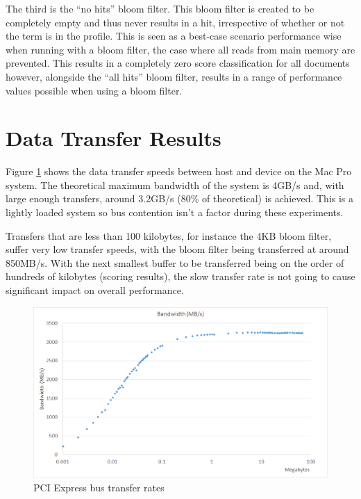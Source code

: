 The third is the ``no hits'' bloom filter. This bloom filter is created to be
completely empty and thus never results in a hit, irrespective of whether or not
the term is in the profile. This is seen as a best-case scenario performance
wise when running with a bloom filter, the case where all reads from main memory
are prevented. This results in a completely zero score classification for all
documents however, alongside the ``all hits'' bloom filter, results in a range
of performance values possible when using a bloom filter.

\section{Data Transfer Results}

Figure \ref{fig:dataTransfer} shows the data transfer speeds between host and
device on the Mac Pro system. The theoretical maximum bandwidth of the system is
4GB/s and, with large enough transfers, around 3.2GB/s (80\% of theoretical)
is achieved. This is a lightly loaded system so bus contention isn't a factor
during these experiments.

Transfers that are less than 100 kilobytes, for instance the 4KB bloom filter,
suffer very low transfer speeds, with the bloom filter being transferred at
around 850MB/s. With the next smallest buffer to be transferred being on the
order of hundreds of kilobytes (scoring results), the slow transfer rate is
not going to cause significant impact on overall performance.

\begin{figure}[H]
\centering
\includegraphics[width=\linewidth]{images/faraBandwidth.png}
\caption{PCI Express bus transfer rates}
\label{fig:dataTransfer}
\end{figure}

